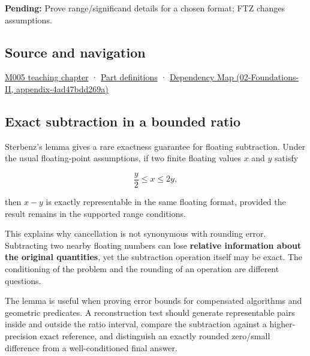 \textbf{Pending:} Prove range/significand details for a chosen format; FTZ changes assumptions.

\subsection{Source and navigation}\label{source-and-navigation}

\href{Continuous\%20Notes/Computing\%20Foundations\%20-\%20From\%20Bits\%20to\%20C++\%20and\%20Systems\%20APIs\#When\%20arithmetic\%20meets\%20uncertainty}{M005 teaching chapter} · \hyperref[appendix-fd090d982a15]{Part definitions} · \href{}{Dependency Map (02-Foundations-II, appendix-4ad47bdd269a)}

\subsection{Exact subtraction in a bounded ratio}\label{exact-subtraction-in-a-bounded-ratio}

Sterbenz's lemma gives a rare exactness guarantee for floating subtraction. Under the usual floating-point assumptions, if two finite floating values \(x\) and \(y\) satisfy

\[
\frac{y}{2} \le x \le 2y,
\]

then \(x-y\) is exactly representable in the same floating format, provided the result remains in the supported range conditions.

This explains why cancellation is not synonymous with rounding error. Subtracting two nearby floating numbers can lose \textbf{relative information about the original quantities}, yet the subtraction operation itself may be exact. The conditioning of the problem and the rounding of an operation are different questions.

The lemma is useful when proving error bounds for compensated algorithms and geometric predicates. A reconstruction test should generate representable pairs inside and outside the ratio interval, compare the subtraction against a higher-precision exact reference, and distinguish an exactly rounded zero/small difference from a well-conditioned final answer.

